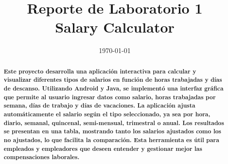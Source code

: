 \documentclass[conference]{IEEEtran}
\date{\specialdate\today}
\begin{document}
%
%
%

\newcommand{\breite}{0.9} %
\newcommand{\RelacionFiguradoscolumnas}{0.9}
\newcommand{\RelacionFiguradoscolumnasPuntoCinco}{0.45}




\title{Reporte de Laboratorio 1 \\ Salary Calculator}

\author{
}



\maketitle

\begin{abstract} 
\textbf{Este proyecto desarrolla una aplicación interactiva para calcular y visualizar diferentes tipos de salarios en función de horas trabajadas y días de descanso. Utilizando Android y Java, se implementó una interfaz gráfica que permite al usuario ingresar datos como salario, horas trabajadas por semana, días de trabajo y días de vacaciones. La aplicación ajusta automáticamente el salario según el tipo seleccionado, ya sea por hora, diario, semanal, quincenal, semi-mensual, trimestral o anual. Los resultados se presentan en una tabla, mostrando tanto los salarios ajustados como los no ajustados, lo que facilita la comparación. Esta herramienta es útil para empleados y empleadores que deseen entender y gestionar mejor las compensaciones laborales.}
\end{abstract}


\end{document}
